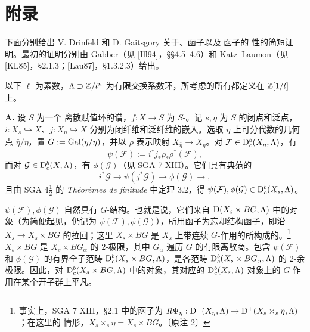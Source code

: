 \chapter*{附录}
下面分别给出 V. Drinfeld 和 D. Gaitsgory 关于、函子以及 函子的 性的简短证明。最初的证明分别由 Gabber（见 [Ill94]，\S\S 4.5--4.6）和 Katz--Laumon（见 [KL85]，\S 2.1.3；[Lau87]，\S 1.3.2.3）给出。

以下 $\ell$ 为素数，$\Lambda\supset\mathbb Z/l^n$ 为有限交换系数环，所考虑的所有都定义在 $\mathbb Z[1/l]$ 上。

\par\medskip\noindent\textbf{A.} 设 $S$ 为一个 离散赋值环的谱，$f:X\to S$ 为 $S$-。记 $s,\eta$ 为 $S$ 的闭点和泛点，$i:X_s\hookrightarrow X$、$j:X_\eta\hookrightarrow X$ 分别为闭纤维和泛纤维的嵌入。选取 $\eta$ 上可分代数的几何点 $\bar\eta/\eta$，置 $G:=\operatorname{Gal}(\relax\eta/\eta)$，并以 $\rho$ 表示映射 $X_{\bar\eta}\to X_\eta$。对 $\mathcal F\in\mathrm{D}_c^b(X_\eta,\Lambda)$，有
\[
\psi(\mathcal F):=i^*j_*\rho_*\rho^*(\mathcal F),
\]
而对 $\mathcal G\in\mathrm{D}_c^b(X,\Lambda)$，有 $\phi(\mathcal G)$（见 SGA 7 XIII）。它们具有典范的
\[
i^*\mathcal G\longrightarrow\psi(j^*\mathcal G)\longrightarrow\phi(\mathcal G)\longrightarrow,
\]
且由 SGA $4\frac12$ 的 \emph{Théorèmes de finitude} 中定理 3.2，得 $\psi(\mathcal F),\phi(\mathcal G)\in\mathrm{D}_c^b(X_s,\Lambda)$。

 $\psi(\mathcal F),\phi(\mathcal G)$ 自然具有 $G$-结构。也就是说，它们来自 $\mathrm{D}(X_s\times BG,\Lambda)$ 中的对象（为简便起见，仍记为 $\psi(\mathcal F),\phi(\mathcal G)$），所用函子为忘却结构函子，即沿 $X_s\to X_s\times BG$ 的拉回；这里 $X_s\times BG$ 是 $X_s$ 上带连续 $G$-作用的所构成的。\footnote{事实上，SGA 7 XIII，\S 2.1 中的函子为 $R\Psi_\eta:\mathrm{D}^+(X_\eta,\Lambda)\to\mathrm{D}^+(X_s\times_s\eta,\Lambda)$；在这里的 情形，$X_s\times_s\eta=X_s\times BG$。〔原注 2〕}  $X_s\times BG$ 是 $X_s\times BG_\alpha$ 的 $2$-极限，其中 $G_\alpha$ 遍历 $G$ 的有限离散商。包含 $\psi(\mathcal F)$ 和 $\phi(\mathcal G)$ 的有界全子范畴 $\mathrm{D}_c^b(X_s\times BG,\Lambda)$，是各范畴 $\mathrm{D}_c^b(X_s\times BG_\alpha,\Lambda)$ 的 $2$-余极限。因此，对 $\mathrm{D}_c^b(X_s\times BG,\Lambda)$ 中的对象，其对应的 $\mathrm{D}_c^b(X_s,\Lambda)$ 对象上的 $G$-作用在某个开子群上平凡。

